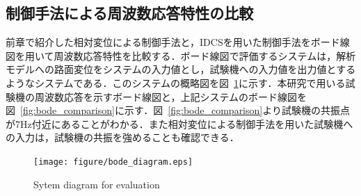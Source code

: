 \documentclass[a4paper,12pt]{article_vdlab_sotsuron}
\begin{document}
\subsection{制御手法による周波数応答特性の比較}
前章で紹介した相対変位による制御手法と，IDCSを用いた制御手法をボード線図を用いて周波数応答特性を比較する．ボード線図で評価するシステムは，解析モデルへの路面変位をシステムの入力値とし，試験機への入力値を出力値とするようなシステムである．このシステムの概略図を図~\ref{fig:bode_diagram}に示す．本研究で用いる試験機の周波数応答を示すボード線図と，上記システムのボード線図を図~\ref{fig:bode_comparison}に示す．図~\ref{fig:bode_comparison}より試験機の共振点が7Hz付近にあることがわかる．また相対変位による制御手法を用いた試験機への入力は，試験機の共振を強めることも確認できる．

\vspace{7mm}
\begin{figure}[htp]
  \begin{center}
    \texttt{[image: figure/bode\_diagram.eps]}
    \caption{Sytem diagram for evaluation}
    \label{fig:bode_diagram}
  \end{center}
\end{figure}
\end{document}
